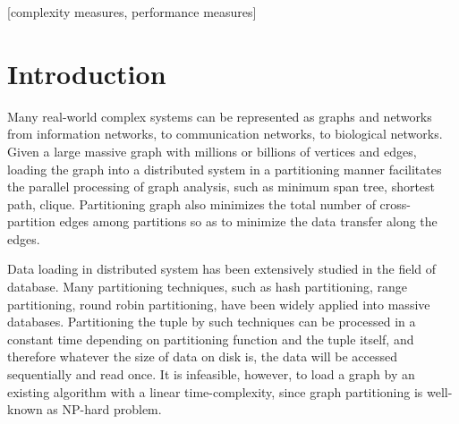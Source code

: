 \documentclass{sig-alternate-2013}
\begin{document}
[complexity measures, performance measures]



\section{Introduction}
Many real-world complex systems can be represented as graphs and networks from information networks, to communication networks, to biological networks. Given a large massive graph with millions or billions of vertices and edges, loading the graph into a distributed system in a partitioning manner facilitates the parallel processing of graph analysis, such as minimum span tree, shortest path, clique. Partitioning graph also minimizes the total number of cross-partition edges among partitions so as to minimize the data transfer along the edges.

Data loading in distributed system has been extensively studied in the field of database. Many partitioning techniques, such as hash partitioning, range partitioning, round robin partitioning, have been widely applied into massive databases. Partitioning the tuple by such techniques can be processed in a constant time depending on partitioning function and the tuple itself, and therefore whatever the size of data on disk is, the data will be accessed sequentially and read once. It is infeasible, however, to load a graph by an existing algorithm with a linear time-complexity, since graph partitioning is well-known as NP-hard problem.
\end{document}
